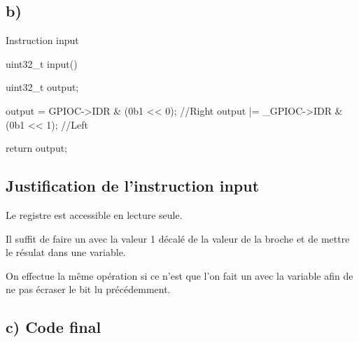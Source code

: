 \subsection{b)}

\begin{Cpp}{Instruction input}

uint32_t input() {

    uint32_t output;

    output = GPIOC->IDR & (0b1 << 0);  //Right
    output |= _GPIOC->IDR & (0b1 << 1); //Left
    
    return output;
}

\end{Cpp}

\subsection{Justification de l'instruction input}

Le registre  est accessible en lecture seule.

Il suffit de faire un  avec la valeur 1 décalé de la valeur de la broche et de mettre le résulat dans une variable.

On effectue la même opération si ce n'est que l'on fait un  avec la variable  afin de ne pas écraser le bit lu précédemment.


\subsection{c) Code final}


